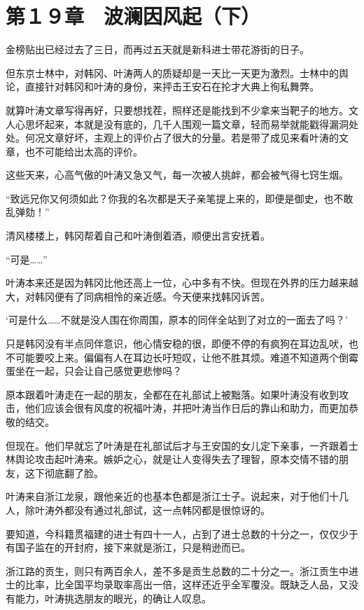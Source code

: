 \section{第１９章　波澜因风起（下）}

金榜贴出已经过去了三日，而再过五天就是新科进士带花游街的日子。

但东京士林中，对韩冈、叶涛两人的质疑却是一天比一天更为激烈。士林中的舆论，直接针对韩冈和叶涛的身份，来抨击王安石在抡才大典上徇私舞弊。

就算叶涛文章写得再好，只要想找茬，照样还是能找到不少拿来当靶子的地方。文人心思坏起来，本就是没有底的，几千人围观一篇文章，轻而易举就能戳得漏洞处处。何况文章好坏，主观上的评价占了很大的分量。若是带了成见来看叶涛的文章，也不可能给出太高的评价。

这些天来，心高气傲的叶涛又急又气，每一次被人挑衅，都会被气得七窍生烟。

“致远兄你又何须如此？你我的名次都是天子亲笔提上来的，即便是御史，也不敢乱弹劾！”

清风楼楼上，韩冈帮着自己和叶涛倒着酒，顺便出言安抚着。

“可是……”

叶涛本来还是因为韩冈比他还高上一位，心中多有不快。但现在外界的压力越来越大，对韩冈便有了同病相怜的亲近感。今天便来找韩冈诉苦。

‘可是什么……不就是没人围在你周围，原本的同伴全站到了对立的一面去了吗？’

只是韩冈没有半点同伴意识，他心情安稳的很，即便不停的有疯狗在耳边乱吠，也不可能要咬上来。偏偏有人在耳边长吁短叹，让他不胜其烦。难道不知道两个倒霉蛋坐在一起，只会让自己感觉更悲惨吗？

原本跟着叶涛走在一起的朋友，全都在在礼部试上被黜落。如果叶涛没有收到攻击，他们应该会很有风度的祝福叶涛，并把叶涛当作日后的靠山和助力，而更加恭敬的结交。

但现在。他们早就忘了叶涛是在礼部试后才与王安国的女儿定下亲事，一齐跟着士林舆论攻击起叶涛来。嫉妒之心，就是让人变得失去了理智，原本交情不错的朋友，这下彻底翻了脸。

叶涛来自浙江龙泉，跟他亲近的也基本色都是浙江士子。说起来，对于他们十几人，除叶涛外都没有通过礼部试，这一点韩冈都是很惊讶的。

要知道，今科籍贯福建的进士有四十一人，占到了进士总数的十分之一，仅仅少于有国子监在的开封府，接下来就是浙江，只是稍逊而已。

浙江路的贡生，则只有两百余人，差不多是贡生总数的二十分之一。浙江贡生中进士的比率，比全国平均录取率高出一倍，这样还近乎全军覆没。既缺乏人品，又没有能力，叶涛挑选朋友的眼光，的确让人叹息。


